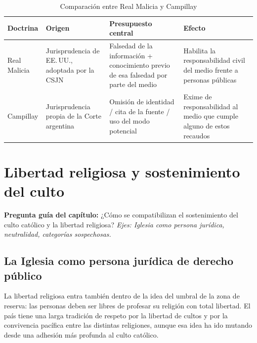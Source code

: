 \documentclass[12pt,oneside]{book}
\begin{document}
\begin{table}[H]
\centering
\caption{Comparación entre Real Malicia y Campillay}
\begin{tabularx}{\textwidth}{>{\raggedright\arraybackslash}p{2.2cm}>{\raggedright\arraybackslash}p{3.3cm}>{\raggedright\arraybackslash}X>{\raggedright\arraybackslash}X}
\toprule
\textbf{Doctrina} & \textbf{Origen} & \textbf{Presupuesto central} & \textbf{Efecto} \\
\midrule
Real Malicia & Jurisprudencia de EE.\,UU., adoptada por la CSJN & Falsedad de la información + conocimiento previo de esa falsedad por parte del medio & Habilita la responsabilidad civil del medio frente a personas públicas \\
\addlinespace
Campillay & Jurisprudencia propia de la Corte argentina & Omisión de identidad / cita de la fuente / uso del modo potencial & Exime de responsabilidad al medio que cumple alguno de estos recaudos \\
\bottomrule
\end{tabularx}
\end{table}

\chapter{Libertad religiosa y sostenimiento del culto}

\begin{note}
\textbf{Pregunta guía del capítulo:} ¿Cómo se compatibilizan el sostenimiento del culto católico y la libertad religiosa? \textit{Ejes: Iglesia como persona jurídica, neutralidad, categorías sospechosas.}
\end{note}

\section{La Iglesia como persona jurídica de derecho público}

La libertad religiosa entra también dentro de la idea del umbral de la zona de reserva: las personas deben ser libres de profesar su religión con total libertad. El país tiene una larga tradición de respeto por la libertad de cultos y por la convivencia pacífica entre las distintas religiones, aunque esa idea ha ido mutando desde una adhesión más profunda al culto católico.
\end{document}
